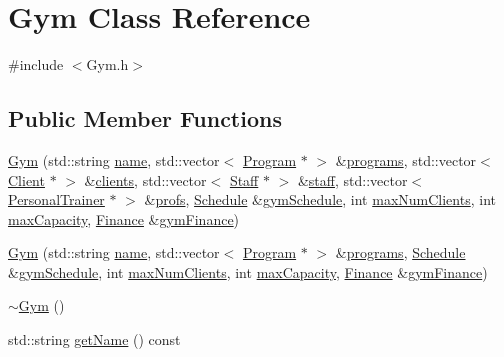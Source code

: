 \hypertarget{classGym}{}\section{Gym Class Reference}
\label{classGym}


{\ttfamily \#include $<$Gym.\+h$>$}

\subsection*{Public Member Functions}
\begin{DoxyCompactItemize}
\item 
\hyperlink{classGym_aea1e156d3dc49601413371e83a024a7f}{Gym} (std\+::string \hyperlink{classGym_a56d26a68f26527592d516348383aed25}{name}, std\+::vector$<$ \hyperlink{classProgram}{Program} $\ast$ $>$ \&\hyperlink{classGym_aeeff90e89fb7b1710886cbf85fc477de}{programs}, std\+::vector$<$ \hyperlink{classClient}{Client} $\ast$ $>$ \&\hyperlink{classGym_a30a9153e0d241801fdc55c3ef3008767}{clients}, std\+::vector$<$ \hyperlink{classStaff}{Staff} $\ast$ $>$ \&\hyperlink{classGym_a9108e2c97ee58a50e491461559aa12fe}{staff}, std\+::vector$<$ \hyperlink{classPersonalTrainer}{Personal\+Trainer} $\ast$ $>$ \&\hyperlink{classGym_afc05320302a5dac7d3b2cb4dfbe42371}{profs}, \hyperlink{classSchedule}{Schedule} \&\hyperlink{classGym_ad48bb78d56dcd88bb4f9f283084a9f37}{gym\+Schedule}, int \hyperlink{classGym_ae0ba7b88dfa18bf69a600dc6bbc437c0}{max\+Num\+Clients}, int \hyperlink{classGym_aa44c525d930ea2ef376d486927caf027}{max\+Capacity}, \hyperlink{classFinance}{Finance} \&\hyperlink{classGym_a3cb79db88f1d6463006e3db741b3992f}{gym\+Finance})
\item 
\hyperlink{classGym_adbb049146a417f3336891f10abbbddb1}{Gym} (std\+::string \hyperlink{classGym_a56d26a68f26527592d516348383aed25}{name}, std\+::vector$<$ \hyperlink{classProgram}{Program} $\ast$ $>$ \&\hyperlink{classGym_aeeff90e89fb7b1710886cbf85fc477de}{programs}, \hyperlink{classSchedule}{Schedule} \&\hyperlink{classGym_ad48bb78d56dcd88bb4f9f283084a9f37}{gym\+Schedule}, int \hyperlink{classGym_ae0ba7b88dfa18bf69a600dc6bbc437c0}{max\+Num\+Clients}, int \hyperlink{classGym_aa44c525d930ea2ef376d486927caf027}{max\+Capacity}, \hyperlink{classFinance}{Finance} \&\hyperlink{classGym_a3cb79db88f1d6463006e3db741b3992f}{gym\+Finance})
\item 
\hyperlink{classGym_ac36cb794c3c14ed73828a36e54f02df0}{$\sim$\+Gym} ()
\item 
std\+::string \hyperlink{classGym_a5501333659451f78c76e24370fb7fd7a}{get\+Name} () const 

\end{DoxyCompactItemize}
